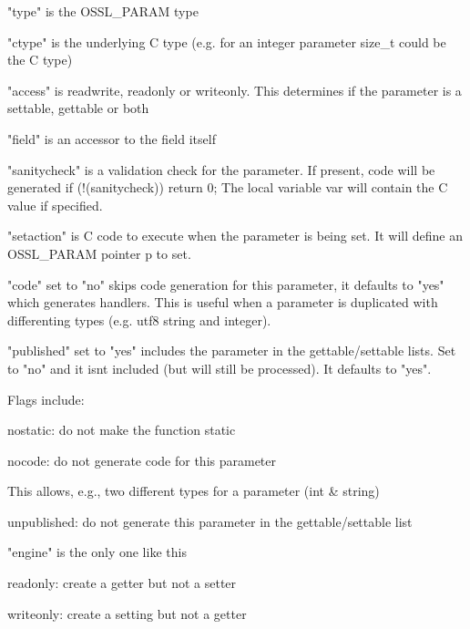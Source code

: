 \begin{DoxyItemize}
\item "{}type"{} is the OSSL\+\_\+\+PARAM type
\item "{}ctype"{} is the underlying C type (e.\+g. for an integer parameter size\+\_\+t could be the C type)
\item "{}access"{} is readwrite, readonly or writeonly. This determines if the parameter is a settable, gettable or both
\item "{}field"{} is an accessor to the field itself
\item "{}sanitycheck"{} is a validation check for the parameter. If present, code will be generated {\ttfamily if (!(sanitycheck)) return 0;} The local variable {\ttfamily var} will contain the C value if specified.
\item "{}setaction"{} is C code to execute when the parameter is being set. It will define an OSSL\+\_\+\+PARAM pointer p to set.
\item "{}code"{} set to "{}no"{} skips code generation for this parameter, it defaults to "{}yes"{} which generates handlers. This is useful when a parameter is duplicated with differenting types (e.\+g. utf8 string and integer).
\item "{}published"{} set to "{}yes"{} includes the parameter in the gettable/settable lists. Set to "{}no"{} and it isn\textquotesingle{}t included (but will still be processed). It defaults to "{}yes"{}.
\item Flags include\+:
\begin{DoxyItemize}
\item nostatic\+: do not make the function static
\item nocode\+: do not generate code for this parameter
\begin{DoxyItemize}
\item This allows, e.\+g., two different types for a parameter (int \& string)
\end{DoxyItemize}
\item unpublished\+: do not generate this parameter in the gettable/settable list
\begin{DoxyItemize}
\item "{}engine"{} is the only one like this
\end{DoxyItemize}
\item readonly\+: create a getter but not a setter
\item writeonly\+: create a setting but not a getter
\end{DoxyItemize}
\end{DoxyItemize}

